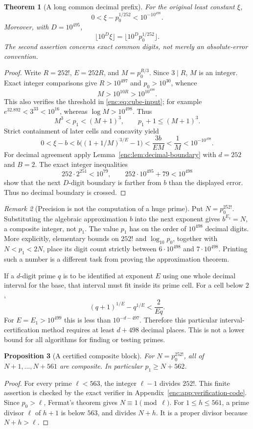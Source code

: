\documentclass[11pt,a4paper]{article}
\newtheorem{theorem}{Theorem}[section]
\newtheorem{proposition}[theorem]{Proposition}
\theoremstyle{definition}
\theoremstyle{remark}
\newtheorem{remark}[theorem]{Remark}
\numberwithin{equation}{section}
\begin{document}
\begin{theorem}[A long common decimal prefix]\label{enc:thm:precision}
For the original least constant $\xi$,
\[
0<\xi-p_0^{1/252}<10^{-10^{498}}.
\]
Moreover, with $D=10^{495}$,
\[
\lfloor10^D\xi\rfloor=\lfloor10^Dp_0^{1/252}\rfloor.
\]
The second assertion concerns exact common digits, not merely an absolute-error convention.
\end{theorem}
\begin{proof}
Write $R=252!$, $E=252R$, and $M=p_0^{R/3}$. Since $3\mid R$, $M$ is an integer. Exact integer comparisons give $R>10^{497}$ and $p_0>10^{30}$, whence
\[
M>10^{10R}>10^{10^{498}}.
\]
This also verifies the threshold in \eqref{enc:eq:cube-input}; for example $e^{32.892}<3^{33}<10^{16}$, whereas $\log M>10^{498}$. Thus
\[
M^3<p_1<(M+1)^3,\qquad p_1+1\le(M+1)^3.
\]
Strict containment of later cells and concavity yield
\[
0<\xi-b<b\big((1+1/M)^{3/E}-1\big)
<\frac{3b}{EM}<\frac1M<10^{-10^{498}}.
\]
For decimal agreement apply Lemma~\ref{enc:lem:decimal-boundary} with $d=252$ and $B=2$. The exact integer inequalities
\[
252\cdot2^{251}<10^{79},\qquad
252\cdot10^{495}+79<10^{498}
\]
show that the next $D$-digit boundary is farther from $b$ than the displayed error. Thus no decimal boundary is crossed.
\end{proof}

\begin{remark}[Precision is not the computation of a huge prime]\label{enc:rem:precision-cost}
Put $N=p_0^{252!}$. Substituting the algebraic approximation $b$ into the next exponent gives $b^{E_1}=N$, a composite integer, not $p_1$. The value $p_1$ has on the order of $10^{498}$ decimal digits. More explicitly, elementary bounds on $252!$ and $\log_{10}p_0$, together with $N<p_1<2N$, place its digit count strictly between $6\cdot10^{498}$ and $7\cdot10^{498}$. Printing such a number is a different task from proving the approximation theorem.

If a $d$-digit prime $q$ is to be identified at exponent $E$ using one whole decimal interval for the base, that interval must fit inside its prime cell. For a cell below $2$,
\[
(q+1)^{1/E}-q^{1/E}<\frac2{Eq}.
\]
For $E=E_1>10^{499}$ this is less than $10^{-d-497}$. Therefore this particular interval-certification method requires at least $d+498$ decimal places. This is not a lower bound for all algorithms for finding or testing primes.
\end{remark}

\begin{proposition}[A certified composite block]\label{enc:prop:composite-block}
For $N=p_0^{252!}$, all of $N+1,\ldots,N+561$ are composite. In particular $p_1\ge N+562$.
\end{proposition}
\begin{proof}
For every prime $\ell<563$, the integer $\ell-1$ divides $252!$. This finite assertion is checked by the exact verifier in Appendix~\ref{enc:app:verification-code}. Since $p_0>\ell$, Fermat's theorem gives $N\equiv1\pmod\ell$. For $1\le h\le561$, a prime divisor $\ell$ of $h+1$ is below $563$, and divides $N+h$. It is a proper divisor because $N+h>\ell$.
\end{proof}
\end{document}
